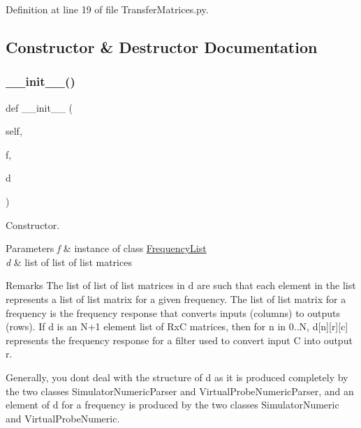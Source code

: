 Definition at line 19 of file Transfer\+Matrices.\+py.



\subsection{Constructor \& Destructor Documentation}
\mbox{\label{classSignalIntegrity_1_1FrequencyDomain_1_1TransferMatrices_1_1TransferMatrices_a7ecbd1152e5e88f11aacf19d825fb16c}} 
\subsubsection{\texorpdfstring{\+\_\+\+\_\+init\+\_\+\+\_\+()}{\_\_init\_\_()}}
{\footnotesize\ttfamily def \+\_\+\+\_\+init\+\_\+\+\_\+ (\begin{DoxyParamCaption}\item[{}]{self,  }\item[{}]{f,  }\item[{}]{d }\end{DoxyParamCaption})}



Constructor. 


\begin{DoxyParams}{Parameters}
{\em f} & instance of class \hyperlink{namespaceSignalIntegrity_1_1FrequencyDomain_1_1FrequencyList}{Frequency\+List} \\
\hline
{\em d} & list of list of list matrices \\
\hline
\end{DoxyParams}
\begin{DoxyRemark}{Remarks}
The list of list of list matrices in d are such that each element in the list represents a list of list matrix for a given frequency. The list of list matrix for a frequency is the frequency response that converts inputs (columns) to outputs (rows). If d is an N+1 element list of RxC matrices, then for n in 0..N, d\mbox{[}n\mbox{]}\mbox{[}r\mbox{]}\mbox{[}c\mbox{]} represents the frequency response for a filter used to convert input C into output r.
\end{DoxyRemark}
Generally, you don\textquotesingle{}t deal with the structure of d as it is produced completely by the two classes Simulator\+Numeric\+Parser and Virtual\+Probe\+Numeric\+Parser, and an element of d for a frequency is produced by the two classes Simulator\+Numeric and Virtual\+Probe\+Numeric. 


